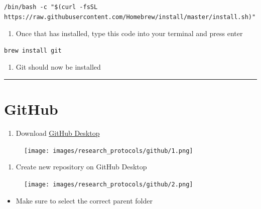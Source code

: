 \documentclass[
]{book}
\providecommand{\tightlist}{%
  \setlength{\itemsep}{0pt}\setlength{\parskip}{0pt}}
\begin{document}
\begin{verbatim}
/bin/bash -c "$(curl -fsSL https://raw.githubusercontent.com/Homebrew/install/master/install.sh)"
\end{verbatim}

\begin{enumerate}
\def\labelenumi{\arabic{enumi}.}
\setcounter{enumi}{2}
\tightlist
\item
  Once that has installed, type this code into your terminal and press enter
\end{enumerate}

\begin{verbatim}
brew install git
\end{verbatim}

\begin{enumerate}
\def\labelenumi{\arabic{enumi}.}
\setcounter{enumi}{3}
\tightlist
\item
  Git should now be installed
\end{enumerate}

\begin{center}\rule{0.5\linewidth}{0.5pt}\end{center}

\hypertarget{github-1}{%
\section{GitHub}\label{github-1}}

\begin{enumerate}
\def\labelenumi{\arabic{enumi}.}
\tightlist
\item
  Download \href{https://desktop.github.com/}{GitHub Desktop}
\end{enumerate}

\begin{figure}
\centering
\texttt{[image: images/research\_protocols/github/1.png]}
\caption{}
\end{figure}

\begin{enumerate}
\def\labelenumi{\arabic{enumi}.}
\setcounter{enumi}{1}
\tightlist
\item
  Create new repository on GitHub Desktop
\end{enumerate}

\begin{figure}
\centering
\texttt{[image: images/research\_protocols/github/2.png]}
\caption{}
\end{figure}

\begin{itemize}
\tightlist
\item
  Make sure to select the correct parent folder
\end{itemize}
\end{document}
